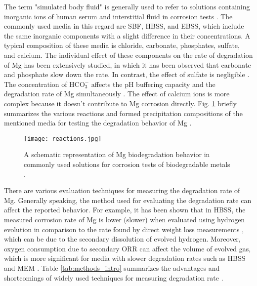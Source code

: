 The term "simulated body fluid" is generally used to refer to solutions containing inorganic ions of human serum and interstitial fluid in corrosion tests \cite{Mei2020}. The commonly used media in this regard are \gls{SBF}, \gls{HBSS}, and \gls{EBSS}, which include the same inorganic components with a slight difference in their concentrations. A typical composition of these media is chloride, carbonate, phosphates, sulfate, and calcium. The individual effect of these components on the rate of degradation of Mg has been extensively studied, in which it has been observed that carbonate and phosphate slow down the rate. In contrast, the effect of sulfate is negligible \cite{Johnston2017,Mei2019a}. The concentration of $\mathrm{HCO}_{3}^{-}$ affects the pH buffering capacity and the degradation rate of Mg simultaneously \cite{Xin2011}. The effect of calcium ions is more complex because it doesn't contribute to Mg corrosion directly. Fig. \ref{fig:reactions_intro} briefly summarizes the various reactions and formed precipitation compositions of the mentioned media for testing the degradation behavior of Mg \cite{Mei2020}.


\begin{figure}
\centering
\medskip
\texttt{[image: reactions.jpg]}
\caption[Mg biodegradation behavior in commonly used test solutions]{A schematic representation of Mg biodegradation behavior in commonly used solutions for corrosion tests of biodegradable metals \cite{Mei2020}.} \label{fig:reactions_intro}
\end{figure}


There are various evaluation techniques for measuring the degradation rate of Mg. Generally speaking, the method used for evaluating the degradation rate can affect the reported behavior. For example, it has been shown that in \gls{HBSS}, the measured corrosion rate of Mg is lower (slower) when evaluated using hydrogen evolution in comparison to the rate found by direct weight loss measurements \cite{Johnston2015,Johnston2019}, which can be due to the secondary dissolution of evolved hydrogen. Moreover, oxygen consumption due to secondary \gls{ORR} can affect the volume of evolved gas, which is more significant for media with slower degradation rates such as \gls{HBSS} and \gls{MEM} \cite{Wang2020}. Table \ref{tab:methods_intro} summarizes the advantages and shortcomings of widely used techniques for measuring degradation rate \cite{Mei2020}. 


